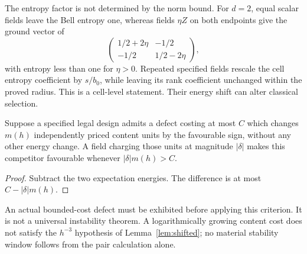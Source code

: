 The entropy factor is not determined by the norm bound. For $d=2$,
equal scalar fields leave the Bell entropy one, whereas fields
$\eta Z$ on both endpoints give the ground vector of
\[
 \begin{pmatrix}1/2+2\eta&-1/2\\-1/2&1/2-2\eta\end{pmatrix},
\]
with entropy less than one for $\eta>0$. Repeated specified fields
rescale the cell entropy coefficient by $s/b_0$, while leaving its
rank coefficient unchanged within the proved radius. This is a
cell-level statement. Their energy shift can alter classical selection.

\begin{proposition}\label{prop:competitor}
Suppose a specified legal design admits a defect costing at most $C$
which changes $m(h)$ independently priced content units by the
favourable sign, without any other energy change. A field charging
those units at magnitude $|\delta|$ makes this competitor favourable
whenever $|\delta|m(h)>C$.
\end{proposition}
\begin{proof}
Subtract the two expectation energies. The difference is at most
$C-|\delta|m(h)$.
\end{proof}
An actual bounded-cost defect must be exhibited before applying this
criterion. It is not a universal instability theorem. A logarithmically
growing content cost does not satisfy the $h^{-3}$ hypothesis of
Lemma~\ref{lem:shifted}; no material stability window follows from the
pair calculation alone.
